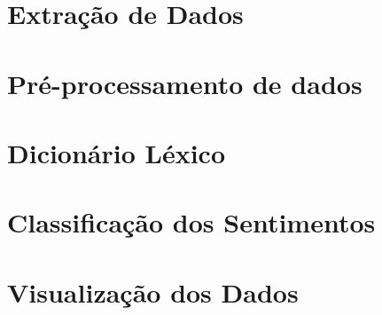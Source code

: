 \section{Extração de Dados}

\section{Pré-processamento de dados}

\section{Dicionário Léxico}

\section{Classificação dos Sentimentos}

\section{Visualização dos Dados}
